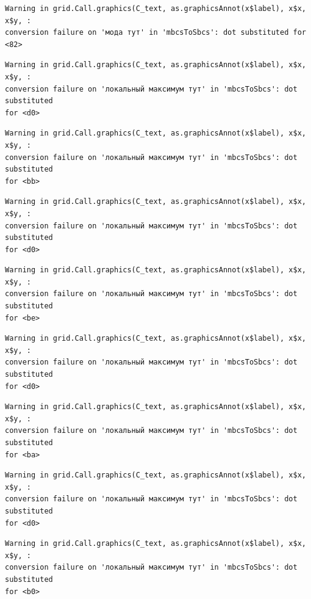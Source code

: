 \documentclass[
  letterpaper,
]{scrbook}
\theoremstyle{definition}
\theoremstyle{remark}
\begin{document}
\begin{verbatim}
Warning in grid.Call.graphics(C_text, as.graphicsAnnot(x$label), x$x, x$y, :
conversion failure on 'мода тут' in 'mbcsToSbcs': dot substituted for <82>
\end{verbatim}

\begin{verbatim}
Warning in grid.Call.graphics(C_text, as.graphicsAnnot(x$label), x$x, x$y, :
conversion failure on 'локальный максимум тут' in 'mbcsToSbcs': dot substituted
for <d0>
\end{verbatim}

\begin{verbatim}
Warning in grid.Call.graphics(C_text, as.graphicsAnnot(x$label), x$x, x$y, :
conversion failure on 'локальный максимум тут' in 'mbcsToSbcs': dot substituted
for <bb>
\end{verbatim}

\begin{verbatim}
Warning in grid.Call.graphics(C_text, as.graphicsAnnot(x$label), x$x, x$y, :
conversion failure on 'локальный максимум тут' in 'mbcsToSbcs': dot substituted
for <d0>
\end{verbatim}

\begin{verbatim}
Warning in grid.Call.graphics(C_text, as.graphicsAnnot(x$label), x$x, x$y, :
conversion failure on 'локальный максимум тут' in 'mbcsToSbcs': dot substituted
for <be>
\end{verbatim}

\begin{verbatim}
Warning in grid.Call.graphics(C_text, as.graphicsAnnot(x$label), x$x, x$y, :
conversion failure on 'локальный максимум тут' in 'mbcsToSbcs': dot substituted
for <d0>
\end{verbatim}

\begin{verbatim}
Warning in grid.Call.graphics(C_text, as.graphicsAnnot(x$label), x$x, x$y, :
conversion failure on 'локальный максимум тут' in 'mbcsToSbcs': dot substituted
for <ba>
\end{verbatim}

\begin{verbatim}
Warning in grid.Call.graphics(C_text, as.graphicsAnnot(x$label), x$x, x$y, :
conversion failure on 'локальный максимум тут' in 'mbcsToSbcs': dot substituted
for <d0>
\end{verbatim}

\begin{verbatim}
Warning in grid.Call.graphics(C_text, as.graphicsAnnot(x$label), x$x, x$y, :
conversion failure on 'локальный максимум тут' in 'mbcsToSbcs': dot substituted
for <b0>
\end{verbatim}
\end{document}
